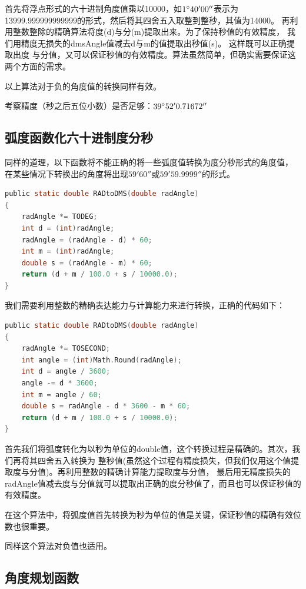 首先将浮点形式的六十进制角度值乘以10000，如$1^\circ 40'00''$表示为
13999.999999999999的形式，然后将其四舍五入取整到整秒，其值为14000。
再利用整数整除的精确算法将度(d)与分(m)提取出来。为了保持秒值的有效精度，
我们用精度无损失的dmsAngle值减去d与m的值提取出秒值(s)。 这样既可以正确提取出度
与分值，又可以保证秒值的有效精度。算法虽然简单，但确实需要保证这两个方面的需求。

 以上算法对于负的角度值的转换同样有效。

 考察精度（秒之后五位小数）是否足够：$39^\circ 52'0.71672''$


\subsection{弧度函数化六十进制度分秒}

同样的道理，以下函数将不能正确的将一些弧度值转换为度分秒形式的角度值，
在某些情况下转换出的角度将出现$59'60''$或$59'59.9999''$的形式。

\begin{lstlisting}[language=C]
public static double RADtoDMS(double radAngle)
{
    radAngle *= TODEG;
    int d = (int)radAngle;
    radAngle = (radAngle - d) * 60;
    int m = (int)radAngle;
    double s = (radAngle - m) * 60;
    return (d + m / 100.0 + s / 10000.0);
}
\end{lstlisting}

我们需要利用整数的精确表达能力与计算能力来进行转换，正确的代码如下：

\begin{lstlisting}[language=C]
public static double RADtoDMS(double radAngle)
{
    radAngle *= TOSECOND;
    int angle = (int)Math.Round(radAngle); 
    int d = angle / 3600;
    angle -= d * 3600;
    int m = angle / 60;
    double s = radAngle - d * 3600 - m * 60;
    return (d + m / 100.0 + s / 10000.0);
}
\end{lstlisting}

首先我们将弧度转化为以秒为单位的double值，这个转换过程是精确的。其次，我们再将其四舍五入转换为
整秒值(虽然这个过程有精度损失，但我们仅用这个值提取度与分值)。再利用整数的精确计算能力提取度与分值，
最后用无精度损失的radAngle值减去度与分值就可以提取出正确的度分秒值了，而且也可以保证秒值的有效精度。

在这个算法中，将弧度值首先转换为秒为单位的值是关键，保证秒值的精确有效位数也很重要。

同样这个算法对负值也适用。

\subsection{角度规划函数}

